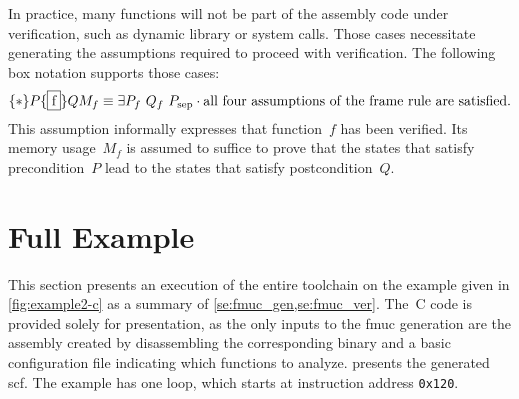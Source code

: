 In practice, many functions will not be part of the assembly code under verification, such as dynamic library or system calls.
Those cases necessitate generating the assumptions required
to proceed with verification.
The following box notation supports those cases:
\begin{equation}
  \{*\}P\{\fbox f\}Q{M_f}\equiv
  \exists P_f~Q_f~P_\mathrm{sep}\cdot
  \text{all four assumptions of the frame rule are satisfied}.
\end{equation}
This assumption informally expresses that function~$f$ has been verified.
Its memory usage~$M_f$ is assumed to suffice to prove that
the states that satisfy precondition~$P$ lead to the states that satisfy%
postcondition~$Q$.%

\section{Full Example}\label{se:syntax_example}
This section presents an execution of the entire toolchain
on the example given in \cref{fig:example2-c}
as a summary of \cref{se:fmuc_gen,se:fmuc_ver}.
The~C code is provided solely for presentation,
as the only inputs to the \ac{fmuc} generation
are the assembly created by disassembling the corresponding binary%
%
%
and a basic configuration file indicating which functions to analyze.
 presents the generated \ac{scf}.
The example has one loop, which starts at instruction address \texttt{0x120}.%
